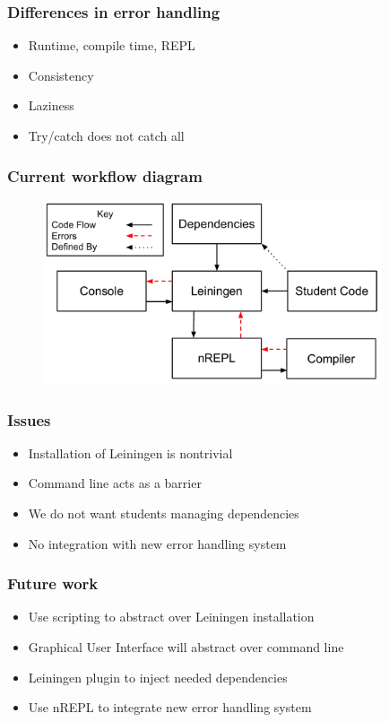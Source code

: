 \documentclass{beamer}
\begin{document}
\begin{frame}
	\frametitle {Differences in error handling}
	\begin{itemize}
		\item Runtime, compile time, REPL
		\item Consistency
		\item Laziness
		\item Try/catch does not catch all
	\end{itemize}
\end{frame}

\begin{frame}[fragile]
\frametitle{Current workflow diagram}
\begin{figure}[h]
 \includegraphics[width=10cm]{../CurrentErrorHandling.pdf}
 \centering
\end{figure}
\end{frame}

\begin{frame}
\frametitle{Issues}
	\begin{itemize}
		\item Installation of Leiningen is nontrivial
		\item Command line acts as a barrier
		\item We do not want students managing dependencies
		\item No integration with new error handling system
	\end{itemize} 
\end{frame}

\begin{frame}
\frametitle{Future work}
	\begin{itemize}
		\item Use scripting to abstract over Leiningen installation
		\item Graphical User Interface will abstract over command line
		\item Leiningen plugin to inject needed dependencies
		\item Use nREPL to integrate new error handling system
	\end{itemize}
\end{frame}
\end{document}
